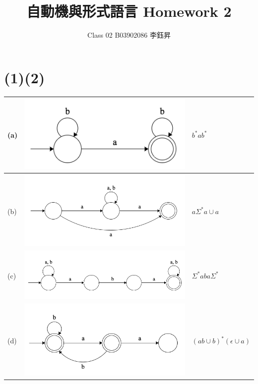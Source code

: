 \documentclass{article}
\title{自動機與形式語言 Homework 2}
\author{Class 02 B03902086 李鈺昇}
\date{}
\begin{document}
    \maketitle
    
    \section*{(1)(2)}
        \begin{tabular}{m{}|m{}|m{}}
            (a) & \includegraphics[width=0.3\paperwidth]{fig/a.png} & $b^*ab^*$ \\
            \hline
            (b) & \includegraphics[width=0.4\paperwidth]{fig/b.png} & $a\Sigma^*a \cup a$ \\
            \hline
            (c) & \includegraphics[width=0.4\paperwidth]{fig/c.png} & $\Sigma^*aba\Sigma^*$ \\
            \hline
            (d) & \includegraphics[width=0.4\paperwidth]{fig/d.png} & $(ab \cup b)^*(\epsilon \cup a)$ \\

\end{tabular}
\end{document}
